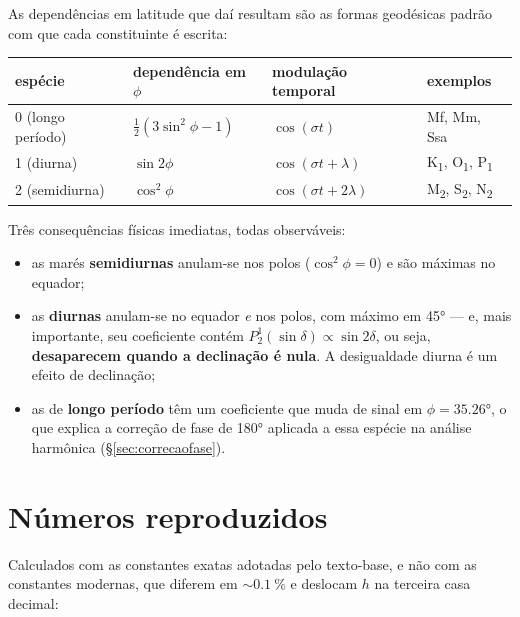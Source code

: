 \documentclass[11pt,a4paper,oneside]{report}
\theoremstyle{definition}
\theoremstyle{plain}
\theoremstyle{remark}
\begin{document}
As dependências em latitude que daí resultam são as formas geodésicas padrão
com que cada constituinte é escrita:
\begin{center}
\begin{tabular}{@{}llll@{}}
\toprule
espécie & dependência em $\phi$ & modulação temporal & exemplos \\
\midrule
0 (longo período) & $\tfrac12(3\sin^{2}\phi-1)$ & $\cos(\sigma t)$ & Mf, Mm, Ssa \\
1 (diurna) & $\sin 2\phi$ & $\cos(\sigma t+\lambda)$ & K\textsubscript{1}, O\textsubscript{1}, P\textsubscript{1} \\
2 (semidiurna) & $\cos^{2}\phi$ & $\cos(\sigma t+2\lambda)$ & M\textsubscript{2}, S\textsubscript{2}, N\textsubscript{2} \\
\bottomrule
\end{tabular}
\end{center}

Três consequências físicas imediatas, todas observáveis:

\begin{itemize}
\item as marés \textbf{semidiurnas} anulam-se nos polos ($\cos^{2}\phi=0$) e são
  máximas no equador;
\item as \textbf{diurnas} anulam-se no equador \emph{e} nos polos, com máximo em
  \ang{45} — e, mais importante, seu coeficiente contém
  $P_2^{1}(\sin\delta)\propto\sin 2\delta$, ou seja, \textbf{desaparecem quando
  a declinação é nula}. A desigualdade diurna é um efeito de declinação;
\item as de \textbf{longo período} têm um coeficiente que muda de sinal em
  $\phi=\ang{35.26}$, o que explica a correção de fase de \ang{180} aplicada a
  essa espécie na análise harmônica (\S\ref{sec:correcaofase}).
\end{itemize}

\section{Números reproduzidos}
\label{sec:numeros}

Calculados com as constantes exatas adotadas pelo texto-base, e não com as
constantes modernas, que diferem em $\sim\SI{0.1}{\percent}$ e deslocam $h$ na
terceira casa decimal:
\end{document}
